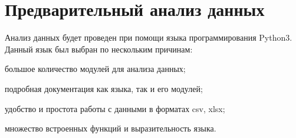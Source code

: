 \section{Предварительный анализ данных}

Анализ данных будет проведен при помощи языка программирования Python3. Данный язык был выбран по нескольким причинам:
\begin{description}[font=$\bullet$]
\item большое количество модулей для анализа данных;
\item подробная документация как языка, так и его модулей;
\item удобство и простота работы с данными в форматах csv, xlsx;
\item множество встроенных функций и выразительность языка.
\end{description}



